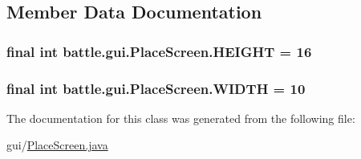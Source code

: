 \subsection{Member Data Documentation}
\hypertarget{classbattle_1_1gui_1_1_place_screen_ade40d1f1c52244a32d6e8718dc662d2d}{}
\subsubsection[{H\+E\+I\+G\+H\+T}]{\setlength{\rightskip}{0pt plus 5cm}final int battle.\+gui.\+Place\+Screen.\+H\+E\+I\+G\+H\+T = 16\hspace{0.3cm}{\ttfamily [static]}}\label{classbattle_1_1gui_1_1_place_screen_ade40d1f1c52244a32d6e8718dc662d2d}
\hypertarget{classbattle_1_1gui_1_1_place_screen_aed4d70ef868550ef0f7d02e26874b8e1}{}
\subsubsection[{W\+I\+D\+T\+H}]{\setlength{\rightskip}{0pt plus 5cm}final int battle.\+gui.\+Place\+Screen.\+W\+I\+D\+T\+H = 10\hspace{0.3cm}{\ttfamily [static]}}\label{classbattle_1_1gui_1_1_place_screen_aed4d70ef868550ef0f7d02e26874b8e1}


The documentation for this class was generated from the following file\+:\begin{DoxyCompactItemize}
\item 
gui/\hyperlink{_place_screen_8java}{Place\+Screen.\+java}\end{DoxyCompactItemize}
